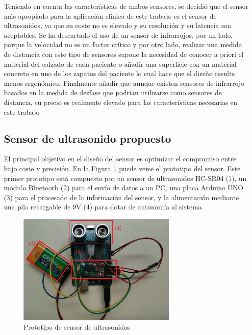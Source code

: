 Teniendo en cuenta las características de ambos sensores, se decidió que el sensor más apropiado para la aplicación clínica de este trabajo es el sensor de ultrasonidos, ya que su coste no es elevado y su resolución y su latencia son aceptables. Se ha descartado el uso de un sensor de infrarrojos, por un lado, porque la velocidad no es un factor crítico y por otro lado, realizar una medida de distancia con este tipo de sensores supone la necesidad de conocer a priori el material del calzado de cada paciente o añadir una superficie con un material concreto en uno de los zapatos del paciente lo cual hace que el diseño resulte menos ergonómico. Finalmente añadir que aunque existen sensores de infrarrojo basados en la medida de desfase que podrían utilizarse como sensores de distancia, su precio es realmente elevado para las características necesarias en este trabajo \cite{infra}
	

\subsection{Sensor de ultrasonido propuesto}\label{su}

	El principal objetivo en el diseño del sensor es optimizar el compromiso entre bajo coste y precisión. En la Figura \ref{fig:sensor_ultrasonido} puede verse el prototipo del sensor. Este primer prototipo está compuesto por un sensor de ultrasonidos HC-SR04 (1), un módulo Bluetooth (2) para el envío de datos a un PC, una placa Arduino UNO (3) para el procesado de la información del sensor, y la alimentación mediante una pila recargable de 9V (4) para dotar de autonomía al sistema.

 \begin{figure}[H]
 	\centering
 	\includegraphics[width=0.7\textwidth]{./graphics/sensor}
 	\caption{Prototipo de sensor de ultrasonidos} \label{fig:sensor_ultrasonido}
 \end{figure}


